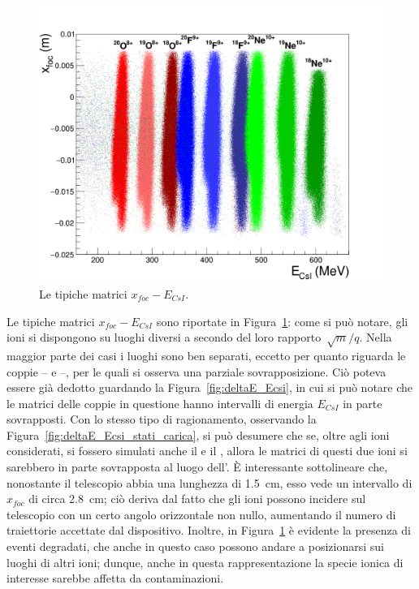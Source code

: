 \begin{figure} [!p]
	\centering
	\includegraphics[width=\textwidth, keepaspectratio]{Grafici_Tesi2/PID/xf_csi_label.png}
	\caption{Le tipiche matrici $x_{foc} - E_{CsI}$.} \label{fig:xf_Ecsi}
\end{figure}

Le tipiche matrici $x_{foc} - E_{CsI}$ sono riportate in Figura~\ref{fig:xf_Ecsi}: come si può notare, gli ioni si dispongono su luoghi diversi a secondo del loro rapporto~$\sqrt{m}/q$. 
Nella maggior parte dei casi i luoghi sono ben separati, eccetto per quanto riguarda le coppie -- e --, per le quali si osserva una parziale sovrapposizione.
Ciò poteva essere già dedotto guardando la Figura~\ref{fig:deltaE_Ecsi}, in cui si può notare che le matrici delle coppie in questione hanno intervalli di energia $E_{CsI}$ in parte sovrapposti.
Con lo stesso tipo di ragionamento, osservando la Figura~\ref{fig:deltaE_Ecsi_stati_carica}, si può desumere che se, oltre agli ioni considerati, si fossero simulati anche il  e il , allora le matrici di questi due ioni si sarebbero in parte sovrapposta al luogo dell'.
È interessante sottolineare che, nonostante il telescopio abbia una lunghezza di 1.5~cm, esso vede un intervallo di $x_{foc}$ di circa 2.8~cm; ciò deriva dal fatto che gli ioni possono incidere sul telescopio con un certo angolo orizzontale non nullo, aumentando il numero di traiettorie accettate dal dispositivo.
Inoltre, in Figura~\ref{fig:xf_Ecsi} è evidente la presenza di eventi degradati, che anche in questo caso possono andare a posizionarsi sui luoghi di altri ioni; dunque, anche in questa rappresentazione la specie ionica di interesse sarebbe affetta da contaminazioni.

